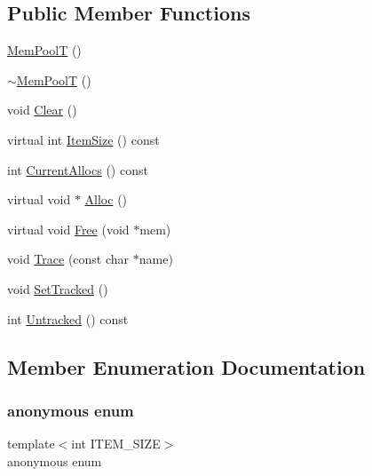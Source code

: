 \subsection*{Public Member Functions}
\begin{DoxyCompactItemize}
\item 
\hyperlink{classtinyxml2_1_1_mem_pool_t_ac8fa6dbb403f009cf9c8a33c6f2803b3}{Mem\+PoolT} ()
\item 
\hyperlink{classtinyxml2_1_1_mem_pool_t_a5fa4fee934a3df2b9e74282244d78390}{$\sim$\+Mem\+PoolT} ()
\item 
void \hyperlink{classtinyxml2_1_1_mem_pool_t_a22d595caa0e9d23aa080f49ca6475fdd}{Clear} ()
\item 
virtual int \hyperlink{classtinyxml2_1_1_mem_pool_t_a54e4d9b343459ef1731314a99877ff35}{Item\+Size} () const
\item 
int \hyperlink{classtinyxml2_1_1_mem_pool_t_a445a6c80151ba6268b24ec62a7c84d74}{Current\+Allocs} () const
\item 
virtual void $\ast$ \hyperlink{classtinyxml2_1_1_mem_pool_t_a810fd2b0caf56b8b688e55f2768f96c7}{Alloc} ()
\item 
virtual void \hyperlink{classtinyxml2_1_1_mem_pool_t_a408ce0918e9d3d5e5e1cc4896944875f}{Free} (void $\ast$mem)
\item 
void \hyperlink{classtinyxml2_1_1_mem_pool_t_a47eefbd934ef70d973ea41d41ab5f239}{Trace} (const char $\ast$name)
\item 
void \hyperlink{classtinyxml2_1_1_mem_pool_t_aee3c611215ae08cce41a940bf2763027}{Set\+Tracked} ()
\item 
int \hyperlink{classtinyxml2_1_1_mem_pool_t_a3bcdc302ae15d2810e11192321a8f5f1}{Untracked} () const
\end{DoxyCompactItemize}


\subsection{Member Enumeration Documentation}
\mbox{\label{classtinyxml2_1_1_mem_pool_t_a04cf45156e6f913f93972869ff8a1d94}} 
\subsubsection{\texorpdfstring{anonymous enum}{anonymous enum}}
{\footnotesize\ttfamily template$<$int I\+T\+E\+M\+\_\+\+S\+I\+ZE$>$ \\
anonymous enum}

